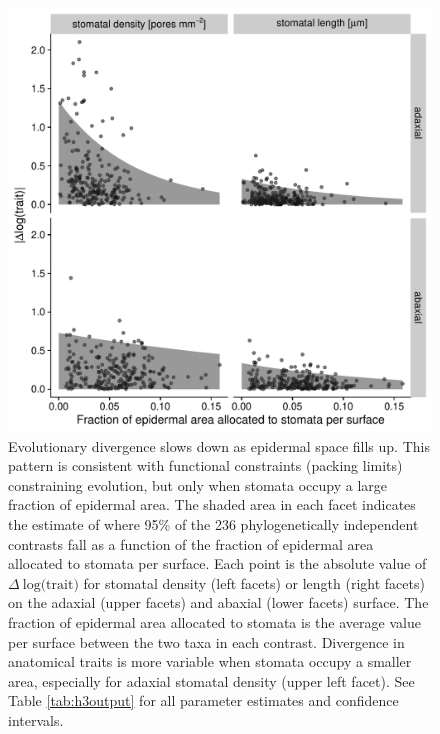 \documentclass[
  12pt,
]{article}
\begin{document}
\begin{figure}[ht]
\includegraphics[width=\textwidth]{../figures/h3.pdf}
\caption{Evolutionary divergence slows down as epidermal space fills up. This pattern is consistent with functional constraints (packing limits) constraining evolution, but only when stomata occupy a large fraction of epidermal area. The shaded area in each facet indicates the estimate of where 95\% of the 236 phylogenetically independent contrasts fall as a function of the fraction of epidermal area allocated to stomata per surface. Each point is the absolute value of  $\Delta~\textrm{log(trait)}$ for stomatal density (left facets) or length (right facets) on the adaxial (upper facets) and abaxial (lower facets) surface. The fraction of epidermal area allocated to stomata is the average value per surface between the two taxa in each contrast. Divergence in anatomical traits is more variable when stomata occupy a smaller area, especially for adaxial stomatal density (upper left facet). See Table \ref{tab:h3output} for all parameter estimates and confidence intervals.}
\label{fig:h3}
\end{figure}
\end{document}
